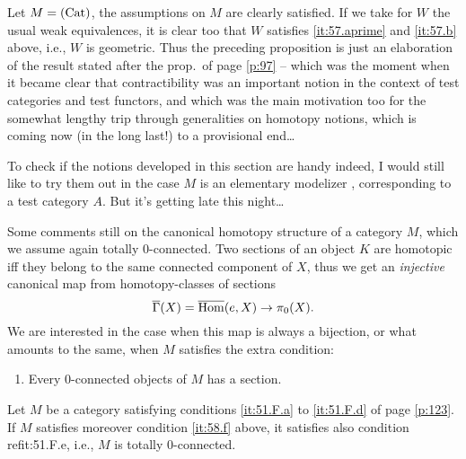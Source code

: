 \begin{example}
  Let $M={(\mathrm{Cat})}$, the assumptions on $M$ are clearly satisfied. If we
  take for $W$ the usual weak equivalences, it is clear too that $W$
  satisfies \ref{it:57.aprime} and \ref{it:57.b} above, i.e., $W$ is
  geometric. Thus the preceding proposition is just an elaboration of
  the result stated after the prop.\ of page \ref{p:97} -- which was
  the moment when it became clear that contractibility was an
  important notion in the context of test categories and test
  functors, and which was the main motivation too for the somewhat
  lengthy trip through generalities on homotopy notions, which is
  coming now (in the long last!) to a provisional end\ldots
\end{example}

To check if the notions developed in this section are handy indeed, I
would still like to try them out in the case $M$ is an elementary
modelizer \Ahat, corresponding to a test category $A$. But it's
getting late this night\ldots

\bigbreak
\presectionfill{}\par

\label{sec:58}%
Some comments still on the canonical homotopy structure of a category
$M$, which we assume again totally $0$-connected. Two sections of an
object $K$ are homotopic if{f} they belong to the same connected
component of $X$, thus we get an \emph{injective} canonical map from
homotopy-classes of sections
\[\overline\Gamma(X)=\operatorname{\overline{Hom}}(e,X) \to \pi_0(X).\]
We are interested in the case when this map is always a bijection, or
what amounts to the same, when $M$ satisfies the extra condition:
\begin{enumerate}[label=\alph*),start=6]
\item\label{it:58.f}
  Every $0$-connected objects of $M$ has a section.
\end{enumerate}
\begin{proposition}
  Let $M$ be a category satisfying conditions \textup{\ref{it:51.F.a}} to
  \textup{\ref{it:51.F.d}} of page \ref{p:123}. If $M$ satisfies
  moreover condition \textup{\ref{it:58.f}} above, it satisfies also
  condition \textup{ref{it:51.F.e}}, i.e., $M$ is totally $0$-connected.
\end{proposition}

